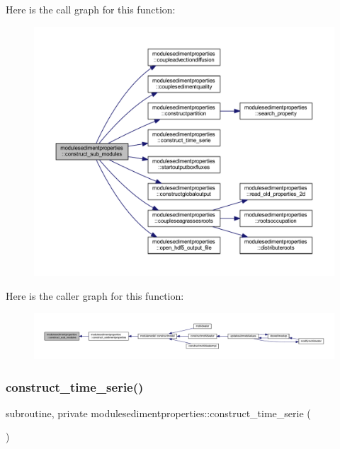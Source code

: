Here is the call graph for this function\+:\nopagebreak
\begin{figure}[H]
\begin{center}
\leavevmode
\includegraphics[width=350pt]{namespacemodulesedimentproperties_a908a832201f28cb160dc5c859ab8af03_cgraph}
\end{center}
\end{figure}
Here is the caller graph for this function\+:\nopagebreak
\begin{figure}[H]
\begin{center}
\leavevmode
\includegraphics[width=350pt]{namespacemodulesedimentproperties_a908a832201f28cb160dc5c859ab8af03_icgraph}
\end{center}
\end{figure}
\mbox{\label{namespacemodulesedimentproperties_a96254e985001cdec16870dc8c0188366}} 
\subsubsection{\texorpdfstring{construct\+\_\+time\+\_\+serie()}{construct\_time\_serie()}}
{\footnotesize\ttfamily subroutine, private modulesedimentproperties\+::construct\+\_\+time\+\_\+serie (\begin{DoxyParamCaption}{ }\end{DoxyParamCaption})\hspace{0.3cm}{\ttfamily [private]}}

